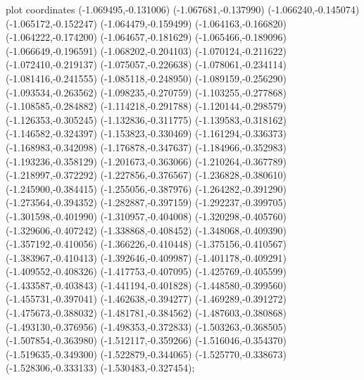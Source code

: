 { plot coordinates {(-1.069495,-0.131006) (-1.067681,-0.137990) (-1.066240,-0.145074) (-1.065172,-0.152247) (-1.064479,-0.159499) (-1.064163,-0.166820) (-1.064222,-0.174200) (-1.064657,-0.181629) (-1.065466,-0.189096) (-1.066649,-0.196591) (-1.068202,-0.204103) (-1.070124,-0.211622) (-1.072410,-0.219137) (-1.075057,-0.226638) (-1.078061,-0.234114) (-1.081416,-0.241555) (-1.085118,-0.248950) (-1.089159,-0.256290) (-1.093534,-0.263562) (-1.098235,-0.270759) (-1.103255,-0.277868) (-1.108585,-0.284882) (-1.114218,-0.291788) (-1.120144,-0.298579) (-1.126353,-0.305245) (-1.132836,-0.311775) (-1.139583,-0.318162) (-1.146582,-0.324397) (-1.153823,-0.330469) (-1.161294,-0.336373) (-1.168983,-0.342098) (-1.176878,-0.347637) (-1.184966,-0.352983) (-1.193236,-0.358129) (-1.201673,-0.363066) (-1.210264,-0.367789) (-1.218997,-0.372292) (-1.227856,-0.376567) (-1.236828,-0.380610) (-1.245900,-0.384415) (-1.255056,-0.387976) (-1.264282,-0.391290) (-1.273564,-0.394352) (-1.282887,-0.397159) (-1.292237,-0.399705) (-1.301598,-0.401990) (-1.310957,-0.404008) (-1.320298,-0.405760) (-1.329606,-0.407242) (-1.338868,-0.408452) (-1.348068,-0.409390) (-1.357192,-0.410056) (-1.366226,-0.410448) (-1.375156,-0.410567) (-1.383967,-0.410413) (-1.392646,-0.409987) (-1.401178,-0.409291) (-1.409552,-0.408326) (-1.417753,-0.407095) (-1.425769,-0.405599) (-1.433587,-0.403843) (-1.441194,-0.401828) (-1.448580,-0.399560) (-1.455731,-0.397041) (-1.462638,-0.394277) (-1.469289,-0.391272) (-1.475673,-0.388032) (-1.481781,-0.384562) (-1.487603,-0.380868) (-1.493130,-0.376956) (-1.498353,-0.372833) (-1.503263,-0.368505) (-1.507854,-0.363980) (-1.512117,-0.359266) (-1.516046,-0.354370) (-1.519635,-0.349300) (-1.522879,-0.344065) (-1.525770,-0.338673) (-1.528306,-0.333133) (-1.530483,-0.327454)};
}
